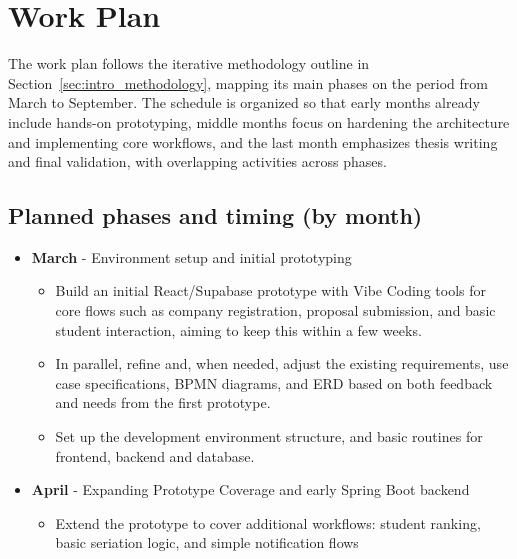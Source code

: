 \section{Work Plan}
\label{sec:sol_workplan}
\ntindex[Template]{}
    {
        The work plan follows the iterative methodology outline in Section~\ref{sec:intro_methodology}, mapping its main phases on the period from 
        March to September. 
        The schedule is organized so that early months already include hands-on prototyping, middle months focus on hardening the architecture and 
        implementing core workflows, and the last month emphasizes thesis writing and final validation, with overlapping activities across phases.
    }
    {
        \subsection*{Planned phases and timing (by month)}
            \begin{itemize}
                \item { 
                    {\textbf{March} - Environment setup and initial prototyping}
                    \begin{itemize}
                        \item {
                            Build an initial React/Supabase prototype with Vibe Coding tools for core flows such as company registration, proposal submission, and 
                            basic student interaction, aiming to keep this within a few weeks.
                        }
                        \item {
                            In parallel, refine and, when needed, adjust the existing requirements, use case specifications, BPMN diagrams, and ERD based on both feedback
                            and needs from the first prototype.
                        }
                        \item {
                            Set up the development environment structure, and basic  routines for frontend, backend and database.
                        }
                    \end{itemize}
                }
                \item {
                    {\textbf{April} - Expanding Prototype Coverage and early Spring Boot backend}
                    \begin{itemize}
                        \item {
                            Extend the prototype to cover additional workflows: student ranking, basic seriation logic, and simple notification flows
}
\end{itemize}}
\end{itemize}}
